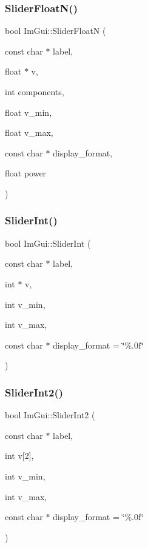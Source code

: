 \mbox{\label{namespace_im_gui_a3ffffbdfe59f18a2321dd1cb39dfb6e1}} 
\subsubsection{\texorpdfstring{Slider\+Float\+N()}{SliderFloatN()}}
{\footnotesize\ttfamily bool Im\+Gui\+::\+Slider\+FloatN (\begin{DoxyParamCaption}\item[{const char $\ast$}]{label,  }\item[{float $\ast$}]{v,  }\item[{int}]{components,  }\item[{float}]{v\+\_\+min,  }\item[{float}]{v\+\_\+max,  }\item[{const char $\ast$}]{display\+\_\+format,  }\item[{float}]{power }\end{DoxyParamCaption})}

\mbox{\label{namespace_im_gui_adfa3869210878bbf2c92c3c9383534f5}} 
\subsubsection{\texorpdfstring{Slider\+Int()}{SliderInt()}}
{\footnotesize\ttfamily bool Im\+Gui\+::\+Slider\+Int (\begin{DoxyParamCaption}\item[{const char $\ast$}]{label,  }\item[{int $\ast$}]{v,  }\item[{int}]{v\+\_\+min,  }\item[{int}]{v\+\_\+max,  }\item[{const char $\ast$}]{display\+\_\+format = {\ttfamily \char`\"{}\%.0f\char`\"{}} }\end{DoxyParamCaption})}

\mbox{\label{namespace_im_gui_a9dbd0490704d3bb4be10fdebe21d402d}} 
\subsubsection{\texorpdfstring{Slider\+Int2()}{SliderInt2()}}
{\footnotesize\ttfamily bool Im\+Gui\+::\+Slider\+Int2 (\begin{DoxyParamCaption}\item[{const char $\ast$}]{label,  }\item[{int}]{v\mbox{[}2\mbox{]},  }\item[{int}]{v\+\_\+min,  }\item[{int}]{v\+\_\+max,  }\item[{const char $\ast$}]{display\+\_\+format = {\ttfamily \char`\"{}\%.0f\char`\"{}} }\end{DoxyParamCaption})}

